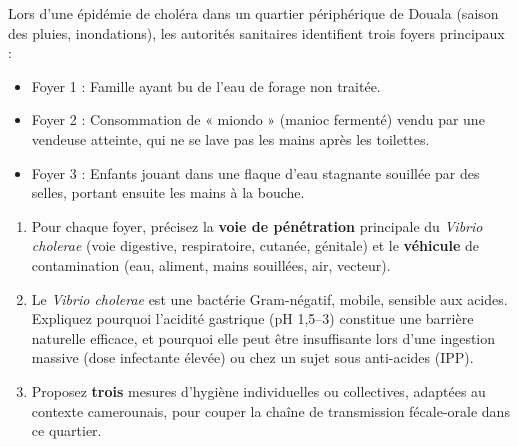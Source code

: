 \documentclass[11pt]{article}
\begin{document}
\begin{exercice}
Lors d'une épidémie de choléra dans un quartier périphérique de Douala (saison des pluies, inondations), les autorités sanitaires identifient trois foyers principaux :
\begin{itemize}
    \item Foyer 1 : Famille ayant bu de l'eau de forage non traitée.
    \item Foyer 2 : Consommation de « miondo » (manioc fermenté) vendu par une vendeuse atteinte, qui ne se lave pas les mains après les toilettes.
    \item Foyer 3 : Enfants jouant dans une flaque d'eau stagnante souillée par des selles, portant ensuite les mains à la bouche.
\end{itemize}

\begin{enumerate}
    \item Pour chaque foyer, précisez la \textbf{voie de pénétration} principale du \emph{Vibrio cholerae} (voie digestive, respiratoire, cutanée, génitale) et le \textbf{véhicule} de contamination (eau, aliment, mains souillées, air, vecteur).
    \item Le \emph{Vibrio cholerae} est une bactérie Gram-négatif, mobile, sensible aux acides. Expliquez pourquoi l'acidité gastrique (pH 1,5--3) constitue une barrière naturelle efficace, et pourquoi elle peut être insuffisante lors d'une ingestion massive (dose infectante élevée) ou chez un sujet sous anti-acides (IPP).
    \item Proposez \textbf{trois} mesures d'hygiène individuelles ou collectives, adaptées au contexte camerounais, pour couper la chaîne de transmission fécale-orale dans ce quartier.
\end{enumerate}
\end{exercice}
\end{document}
